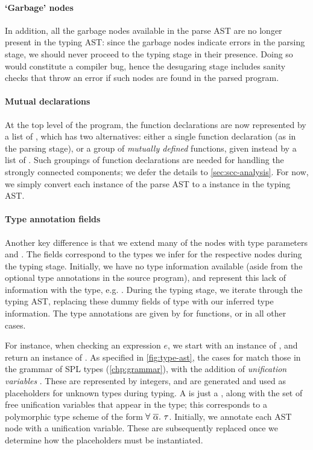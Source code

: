 \paragraph{`Garbage' nodes}
In addition, all the garbage nodes available in the parse AST are no longer
present in the typing AST: since the garbage nodes indicate errors in the
parsing stage, we should never proceed to the typing stage in their presence.
Doing so would constitute a compiler bug, hence the desugaring stage includes
sanity checks that throw an error if such nodes are found in the parsed program.

\paragraph{Mutual declarations}
At the top level of the program, the function declarations are now represented
by a list of , which has two alternatives: either a single
function declaration  (as in the parsing stage), or a group of
\emph{mutually defined} functions, given instead by a list of .
Such groupings of function declarations are needed for handling the strongly
connected components; we defer the details to \cref{sec:scc-analysis}.
For now, we simply convert each  instance of the parse AST to
a  instance in the typing AST.

\paragraph{Type annotation fields}
Another key difference is that we extend many of the nodes with type
parameters  and . The fields correspond to the types we
infer for the respective nodes during the typing stage.
Initially, we have no type information available (aside from the optional type
annotations in the source program), and represent this lack of information
with the \haskell{()} type, e.g. . During the typing stage, we
iterate through the typing AST, replacing these dummy fields of type \haskell{()}
with our inferred type information. The type annotations are given by
 for functions, or  in all other cases.

For instance, when checking an expression $e$, we start with an instance of
, and return an instance of .
As specified in \cref{fig:type-ast}, the cases for  match those
in the grammar of SPL types (\cref{chp:grammar}), with the addition of
\emph{unification variables} . These are represented by integers,
and are generated and used as placeholders for unknown types during typing.
A  is just a , along with the set of free
unification variables that appear in the type; this corresponds to a polymorphic
type scheme of the form $\forall\ \overline{\alpha}.\ \tau$.
Initially, we  annotate each AST node with a unification variable. These are
subsequently replaced once we determine how the placeholders must be
instantiated.

